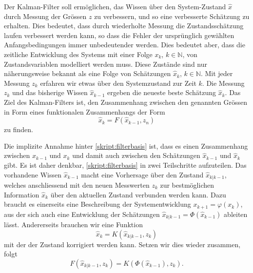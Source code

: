 Der Kalman-Filter soll ermöglichen, das Wissen über den System-Zustand
$\hat x$ durch Messung der Grössen $z$ zu verbessern, und so eine
verbesserte Schätzung zu erhalten.
Dies bedeutet, dass durch wiederholte Messung die Zustandsschätzung
laufen verbessert werden kann, so dass die Fehler der ursprünglich gewählten 
Anfangsbedingungen immer unbedeutender werden.
Dies bedeutet aber, dass die zeitliche Entwicklung des Systems mit einer Folge
$x_k$, $k\in\mathbb N$, von Zustandsvariablen modelliert werden muss.
Diese Zustände sind nur näherungsweise bekannt als eine Folge
von Schätzungen $\hat{x}_k$, $k\in\mathbb N$.
Mit jeder Messung $z_k$ erfahren wir etwas über den Systemzustand
zur Zeit $k$.
Die Messung $z_k$ und das bisherige Wissen $\hat{x}_{k-1}$ ergeben
die neueste beste Schätzung $\hat{x}_k$.
Das Ziel des Kalman-Filters ist, den Zusammenhang zwischen den
genannten Grössen in Form eines funktionalen Zusammenhangs der Form
\begin{equation}
\hat{x}_k = F(\hat{x}_{k-1},z_n)
\label{skript:filterbasis}
\end{equation}
zu finden.

Die implizite Annahme hinter \eqref{skript:filterbasis} ist,
dass es einen Zusammenhang zwischen $x_{k-1}$ und $x_k$ und damit auch
zwischen den Schätzungen $\hat{x}_{k-1}$ und $\hat{x}_k$ gibt.
Es ist daher denkbar, \eqref{skript:filterbasis} in zwei Teilschritte
aufzuteilen.
Das vorhandene Wissen $\hat{x}_{k-1}$ macht eine Vorhersage über den
Zustand $\hat{x}_{k|k-1}$, welches anschliessend mit den neuen 
Messwerten $z_k$ zur bestmöglichen Information $\hat{x}_k$ über den
aktuellen Zustand verbunden werden kann.
Dazu braucht es einerseits eine Beschreibung der Systementwicklung
$x_{k+1} = \varphi(x_k)$, aus der sich auch eine Entwicklung der
Schätzungen $\hat{x}_{k|k-1} = \Phi(\hat{x}_{k-1})$ ableiten lässt.
Andererseits brauchen wir eine Funktion
\begin{equation}
\hat{x}_k = K(\hat{x}_{k|k-1}, z_k)
\end{equation}
mit der der Zustand korrigiert werden kann.
Setzen wir dies wieder zusammen, folgt
\[
F(\hat{x}_{k|k-1},z_k)
=
K(\Phi(\hat{x}_{k-1}),z_k).
\]

